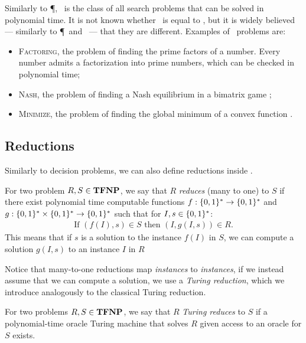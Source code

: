Similarly to \P, \FP\ is the class of all search problems that can be solved in polynomial time. It is not known whether \FP\ is equal to \TFNP, but it is widely believed --- similarly to \P\ and \NP\ --- that they are different. Examples of \TFNP\ problems are:
\begin{itemize}
	\item \textsc{Factoring}, the problem of finding the prime factors of a number. Every number admits a factorization into prime numbers, which can be checked in polynomial time;
	\item \textsc{Nash}, the problem of finding a Nash equilibrium in a bimatrix game ;
	\item \textsc{Minimize}, the problem of finding the global minimum of a convex function .
\end{itemize}

\subsection{Reductions}

Similarly to decision problems, we can also define reductions inside \TFNP.

\begin{definition}
	For two problem $R, S \in \textbf{TFNP}$, we say that $R$ \emph{reduces} (many to one) to $S$ if there exist polynomial time computable functions $f : \{0, 1\}^* \rightarrow \{0, 1\}^*$ and $g : \{0, 1\}^* \times \{0, 1\}^* \rightarrow \{0, 1\}^*$ such that for $I, s \in \{0, 1\}^*$:
	\begin{align*}
		\text{If } (f(I), s) \in S \text{ then } (I, g(I, s)) \in R.
	\end{align*}
	This means that if $s$ is a solution to the instance $f(I)$ in $S$, we can compute a solution $g(I, s)$ to an instance $I$ in $R$
\end{definition}

Notice that many-to-one reductions map \emph{instances} to \emph{instances}, if we instead assume that we can compute a solution, we use a \emph{Turing reduction}, which we introduce analogously to the classical Turing reduction.

\begin{definition}
	For two problems $R, S \in \textbf{TFNP}$, we say that $R$ \emph{Turing reduces} to $S$ if a polynomial-time oracle Turing machine that solves $R$ given access to an oracle for $S$ exists.
\end{definition}

